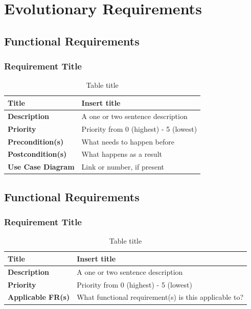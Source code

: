 \documentclass{article}
\begin{document}
\clearpage

\section{Evolutionary Requirements}

\subsection{Functional Requirements}

\subsubsection{Requirement Title}

\begin{table}[H]
\caption{Table title}
\begin{tabularx}{\textwidth}{|l|X|}
    \hline
    \textbf{Title} & Insert title \\ \hline
    \textbf{Description} &  A one or two sentence description \\ \hline 
    \textbf{Priority} &  Priority from 0 (highest) - 5 (lowest) \\ \hline 
    \textbf{Precondition(s)} &  What needs to happen before \\ \hline
    \textbf{Postcondition(s)} &  What happens as a result \\ \hline
    \textbf{Use Case Diagram} &  Link or number, if present \\  \hline                 
\end{tabularx}
\end{table}

\subsection{Functional Requirements}

\subsubsection{Requirement Title}

\begin{table}[H]
\caption{Table title}
\begin{tabularx}{\textwidth}{|l|X|}
    \hline
    \textbf{Title} & Insert title \\ \hline
    \textbf{Description} &  A one or two sentence description \\ \hline 
    \textbf{Priority} &  Priority from 0 (highest) - 5 (lowest) \\ \hline 
    \textbf{Applicable FR(s)} &  What functional requirement(s) is this applicable to? \\ \hline            
\end{tabularx}
\end{table}
\end{document}
